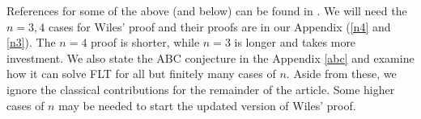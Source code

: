 \documentclass{article}
\theoremstyle{definition}
\theoremstyle{definition}
\theoremstyle{definition}
\begin{document}
References for some of the above (and below) can be found in \cite{DDT}.
\newline\newline
We will need the $n=3,4$ cases for Wiles' proof and their proofs are in our Appendix (\ref{n4} and \ref{n3}). The $n=4$ proof is shorter, while $n=3$ is longer and takes more investment. We also state the ABC conjecture in the Appendix \ref{abc} and examine how it can solve FLT for all but finitely many cases of $n$.
\newline\newline
Aside from these, we ignore the classical contributions for the remainder of the article. Some higher cases of $n$ may be needed to start the updated version of Wiles' proof.

\end{document}
